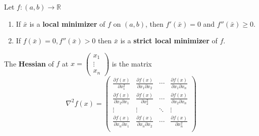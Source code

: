 \begin{corollary}
    Let $f: (a,b) \rightarrow \mathbb R$
    \begin{enumerate}
        \item If $\bar x$ is a \textbf{local minimizer} of $f$ on $(a,b)$, then $f'(\bar x) = 0$ and $f''(\bar x) \geq 0$.
        \item If $f(\bar x) = 0, f''(\bar x) > 0$ then $\bar x$ is a \textbf{strict local minimizer} of $f$.
    \end{enumerate}
\end{corollary}
\begin{definition}[Hessian]
    The \textbf{Hessian} of $f$ at $x = \begin{pmatrix}
        x_1 \\ \vdots \\ x_n
    \end{pmatrix}$ is the matrix
    $$\nabla^2 f(x) = \begin{pmatrix}
        \frac{\partial f(x)}{\partial x^2_1} & \frac{\partial f(x)}{\partial x_1 \partial x_2} & \cdots & \frac{\partial f(x)}{\partial x_1 \partial x_n} \\
        \frac{\partial f(x)}{\partial x_2 \partial x_1} & \frac{\partial f(x)}{\partial x_2^2} & \cdots & \frac{\partial f(x)}{\partial x_2 \partial x_n} \\
        \vdots & \vdots & \ddots & \vdots \\
        \frac{\partial f(x)}{\partial x_n \partial x_1} & \frac{\partial f(x)}{\partial x_n \partial x_2} & \cdots & \frac{\partial f(x)}{\partial x_n^2} \\
    \end{pmatrix}$$
\end{definition}


% 